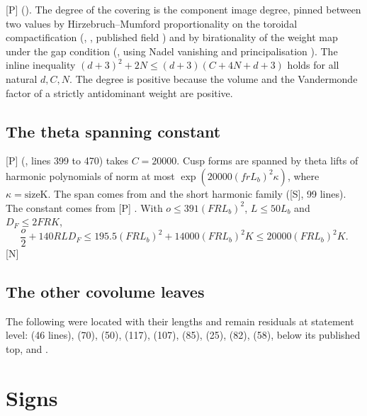 \documentclass[11pt]{article}
\newcommand{\mP}{\textsf{[P]}}
\newcommand{\mS}{\textsf{[S]}}
\newcommand{\mN}{\textsf{[N]}}
\theoremstyle{remark}
\begin{document}
\mP{}  (). The degree of the covering is the component image degree, pinned between two values by Hirzebruch--Mumford proportionality on the toroidal compactification (, , published field ) and by birationality of the weight map under the gap condition (, using Nadel vanishing  and principalisation ). The inline inequality $(d+3)^2+2N\le(d+3)(C+4N+d+3)$ holds for all natural $d,C,N$. The degree is positive because the volume and the Vandermonde factor of a strictly antidominant weight are positive.

\subsection{The theta spanning constant}

\mP{}  (, lines 399 to 470) takes $C=20000$. Cusp forms are spanned by theta lifts of harmonic polynomials of norm at most $\exp(20000(frL_b)^2\kappa)$, where $\kappa=\mathrm{sizeK}$. The span comes from  and the short harmonic family  (\mS, 99 lines). The constant comes from \mP{} . With $o\le391(FRL_b)^2$, $L\le50L_b$ and $D_F\le2FRK$,
\[
\frac o2+140RLD_F\le195.5(FRL_b)^2+14000(FRL_b)^2K\le20000(FRL_b)^2K.
\]
\mN

\subsection{The other covolume leaves}

The following were located with their lengths and remain residuals at statement level:  (46 lines),  (70),  (50),  (117),  (107),  (85),  (25),  (82),  (58),  below its published top, and .

\section{Signs}\label{sec:signs}
\end{document}
